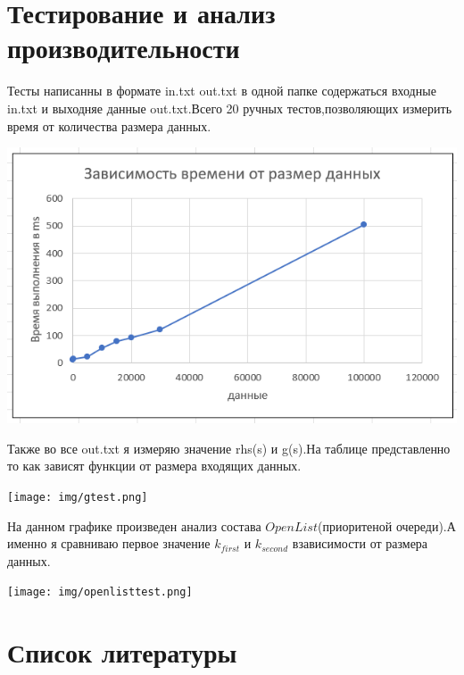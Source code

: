 \documentclass[12pt]{article}
\begin{document}
    
\newpage  
\begin{center}
   \hypertarget{a5}{\section*{Тестирование и анализ производительности}}
\end{center}
Тесты написанны в формате in.txt out.txt в одной папке содержаться входные in.txt и выходняе данные out.txt.Всего 20 ручных тестов,позволяющих измерить время от количества размера данных.
\begin{center}
        \includegraphics[width=1.1\textwidth]{img/datetime.png}
    \end{center}
Также во все out.txt  я измеряю значение rhs(s) и g(s).На таблице представленно то как зависят функции от размера входящих данных.
\begin{center}
        \texttt{[image: img/gtest.png]}
    \end{center}
На данном графике произведен анализ состава $OpenList$(приоритеной очереди).А именно я сравниваю первое значение $k_{first}$ и $k_{second}$  взависимости от размера данных.
\begin{center}
        \texttt{[image: img/openlisttest.png]}
    \end{center}
\newpage  
\begin{center}
   \hypertarget{a6}{\section*{Список литературы}}
\end{center}

\nocite{*}
\printbibliography
\end{document}
